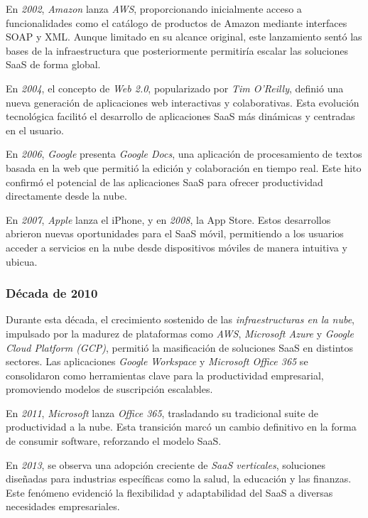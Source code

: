 {                En \textit{2002}, \textit{Amazon} lanza \textit{AWS}, proporcionando inicialmente acceso a funcionalidades como el catálogo de productos de Amazon mediante interfaces SOAP y XML. Aunque limitado en su alcance original, este lanzamiento sentó las bases de la infraestructura que posteriormente permitiría escalar las soluciones SaaS de forma global.
                
                En \textit{2004}, el concepto de \textit{Web 2.0}, popularizado por \textit{Tim O'Reilly}, definió una nueva generación de aplicaciones web interactivas y colaborativas. Esta evolución tecnológica facilitó el desarrollo de aplicaciones SaaS más dinámicas y centradas en el usuario.
                
                En \textit{2006}, \textit{Google} presenta \textit{Google Docs}, una aplicación de procesamiento de textos basada en la web que permitió la edición y colaboración en tiempo real. Este hito confirmó el potencial de las aplicaciones SaaS para ofrecer productividad directamente desde la nube.
                
                En \textit{2007}, \textit{Apple} lanza el iPhone, y en \textit{2008}, la App Store. Estos desarrollos abrieron nuevas oportunidades para el SaaS móvil, permitiendo a los usuarios acceder a servicios en la nube desde dispositivos móviles de manera intuitiva y ubicua.

            \subsubsection{Década de 2010}
                Durante esta década, el crecimiento sostenido de las \textit{infraestructuras en la nube}, impulsado por la madurez de plataformas como \textit{AWS}, \textit{Microsoft Azure} y \textit{Google Cloud Platform (GCP)}, permitió la masificación de soluciones SaaS en distintos sectores. Las aplicaciones \textit{Google Workspace} y \textit{Microsoft Office 365} se consolidaron como herramientas clave para la productividad empresarial, promoviendo modelos de suscripción escalables.
                
                En \textit{2011}, \textit{Microsoft} lanza \textit{Office 365}, trasladando su tradicional suite de productividad a la nube. Esta transición marcó un cambio definitivo en la forma de consumir software, reforzando el modelo SaaS.
                
                En \textit{2013}, se observa una adopción creciente de \textit{SaaS verticales}, soluciones diseñadas para industrias específicas como la salud, la educación y las finanzas. Este fenómeno evidenció la flexibilidad y adaptabilidad del SaaS a diversas necesidades empresariales.
                
}
